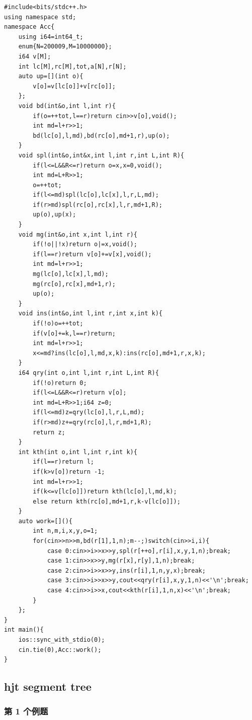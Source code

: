 \documentclass[UTF8, a4paper, titlepage, twoside]{ctexart}
\begin{document}
\begin{lstlisting}[style=cpp]
#include<bits/stdc++.h>
using namespace std;
namespace Acc{
    using i64=int64_t;
    enum{N=200009,M=10000000};
    i64 v[M];
    int lc[M],rc[M],tot,a[N],r[N];
    auto up=[](int o){
        v[o]=v[lc[o]]+v[rc[o]];
    };
    void bd(int&o,int l,int r){
        if(o=++tot,l==r)return cin>>v[o],void();
        int md=l+r>>1;
        bd(lc[o],l,md),bd(rc[o],md+1,r),up(o);
    }
    void spl(int&o,int&x,int l,int r,int L,int R){
        if(l<=L&&R<=r)return o=x,x=0,void();
        int md=L+R>>1;
        o=++tot;
        if(l<=md)spl(lc[o],lc[x],l,r,L,md);
        if(r>md)spl(rc[o],rc[x],l,r,md+1,R);
        up(o),up(x);
    }
    void mg(int&o,int x,int l,int r){
        if(!o||!x)return o|=x,void();
        if(l==r)return v[o]+=v[x],void();
        int md=l+r>>1;
        mg(lc[o],lc[x],l,md);
        mg(rc[o],rc[x],md+1,r);
        up(o);
    }
    void ins(int&o,int l,int r,int x,int k){
        if(!o)o=++tot;
        if(v[o]+=k,l==r)return;
        int md=l+r>>1;
        x<=md?ins(lc[o],l,md,x,k):ins(rc[o],md+1,r,x,k);
    }
    i64 qry(int o,int l,int r,int L,int R){
        if(!o)return 0;
        if(l<=L&&R<=r)return v[o];
        int md=L+R>>1;i64 z=0;
        if(l<=md)z=qry(lc[o],l,r,L,md);
        if(r>md)z+=qry(rc[o],l,r,md+1,R);
        return z;
    }
    int kth(int o,int l,int r,int k){
        if(l==r)return l;
        if(k>v[o])return -1;
        int md=l+r>>1;
        if(k<=v[lc[o]])return kth(lc[o],l,md,k);
        else return kth(rc[o],md+1,r,k-v[lc[o]]);
    }
    auto work=[](){
        int n,m,i,x,y,o=1;
        for(cin>>n>>m,bd(r[1],1,n);m--;)switch(cin>>i,i){
            case 0:cin>>i>>x>>y,spl(r[++o],r[i],x,y,1,n);break;
            case 1:cin>>x>>y,mg(r[x],r[y],1,n);break;
            case 2:cin>>i>>x>>y,ins(r[i],1,n,y,x);break;
            case 3:cin>>i>>x>>y,cout<<qry(r[i],x,y,1,n)<<'\n';break;
            case 4:cin>>i>>x,cout<<kth(r[i],1,n,x)<<'\n';break;
        }
    };
}
int main(){
    ios::sync_with_stdio(0);
    cin.tie(0),Acc::work();
}
\end{lstlisting}

\subsection{ hjt segment tree }

\subsubsection*{ 第 1 个例题 }
\end{document}
